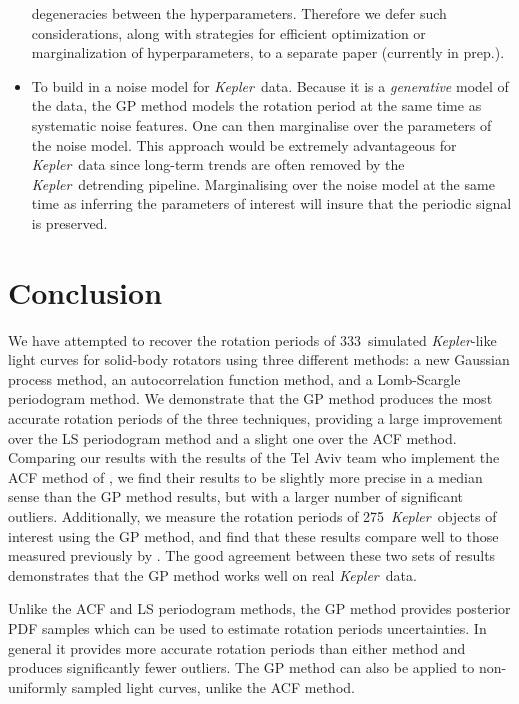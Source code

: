 \documentclass[a4paper,fleqn,usenatbib,useAMS]{mnras}
\newcommand{\Kepler}{{\it Kepler}}
\newcommand{\kepler}{\Kepler}
\newcommand{\naigrain}{333}
\newcommand{\nkoimcq}{275}
\begin{document}
\begin{itemize}
{        degeneracies between the hyperparameters.
        Therefore we defer such considerations, along with strategies for
        efficient optimization or marginalization of hyperparameters, to a
        separate paper (currently in prep.).}
\item{To build in a noise model for \kepler\ data.
        Because it is a {\it generative} model of the data, the GP method
        models the rotation period at the same time as systematic noise
        features.  One can then marginalise over the parameters of the noise
        model.
        This approach would be extremely advantageous for \kepler\ data since
        long-term trends are often removed by the \kepler\ detrending
        pipeline.  Marginalising over the noise model at the same time as
        inferring the parameters of interest will insure that the periodic
        signal is preserved.}
\end{itemize}

\section{Conclusion}

We have attempted to recover the rotation periods of \naigrain\ simulated
\kepler-like light curves for solid-body rotators \citep{Aigrain2015} using
three different methods: a new Gaussian process method,
an autocorrelation function method, and a Lomb-Scargle periodogram method.
We demonstrate that the GP method produces the most accurate rotation periods
of the three techniques, providing a large improvement over the LS periodogram
method and a slight one over the ACF method.
Comparing our results with the results of the \citet{Aigrain2015} Tel Aviv
team who implement the ACF method of \citet{Mcquillan2013},
we find their results to be
slightly more precise in a median sense than the GP method results, but with
a larger number of significant outliers.
Additionally, we measure the rotation periods of \nkoimcq\
\kepler\ objects of interest
using the GP method, and find that these results compare well to those
measured previously by \citet{Mcquillan2013}.
The good agreement between these two sets of results demonstrates that the GP
method works well on real \kepler\ data.

Unlike the ACF and LS periodogram methods, the GP method provides posterior
PDF samples which can be used to estimate rotation periods uncertainties.
In general it provides more accurate rotation periods than either method and
produces significantly fewer outliers.
The GP method can also be applied to non-uniformly sampled light curves,
unlike the ACF method.
\end{document}
